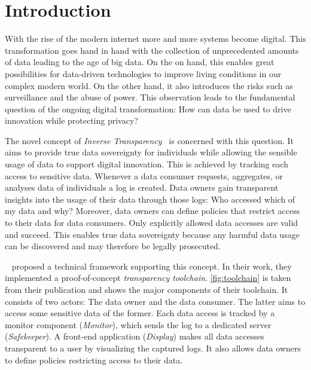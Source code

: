 \documentclass[../main.tex]{subfiles}
\begin{document}
\chapter{Introduction}
With the rise of the modern internet more and more systems become digital.
This transformation goes hand in hand with the collection of unprecedented amounts of data leading to the age of big data.
On the on hand, this enables great possibilities for data-driven technologies to improve living conditions in our complex modern world.
On the other hand, it also introduces the risks such as surveillance and the abuse of power.
This observation leads to the fundamental question of the ongoing digital transformation: How can data be used to drive innovation while protecting privacy?~\cite{Boes2022, Schallmo2016}

The novel concept of \emph{Inverse Transparency}~\cite{Boes2022} is concerned with this question.
It aims to provide true data sovereignty for individuals while allowing the sensible usage of data to support digital innovation.
This is achieved by tracking each access to sensitive data.
Whenever a data consumer requests, aggregates, or analyses data of individuals a log is created.
Data owners gain transparent insights into the usage of their data through those logs:
Who accessed which of my data and why?
Moreover, data owners can define policies that restrict access to their data for data consumers.
Only explicitly allowed data accesses are valid and succeed.
This enables true data sovereignty because any harmful data usage can be discovered and may therefore be legally prosecuted.

\citeauthor{Zieglmeier2021}~\cite{Zieglmeier2021} proposed a technical framework supporting this concept.
In their work, they implemented a proof-of-concept \emph{transparency toolchain}.
\cref{fig:toolchain} is taken from their publication and shows the major components of their toolchain.
It consists of two actors: The data owner and the data consumer.
The latter aims to access some sensitive data of the former.
Each data access is tracked by a monitor component (\emph{Monitor}), which sends the log to a dedicated server (\emph{Safekeeper}).
A front-end application (\emph{Display}) makes all data accesses transparent to a user by visualizing the captured logs.
It also allows data owners to define policies restricting access to their data.
\end{document}
